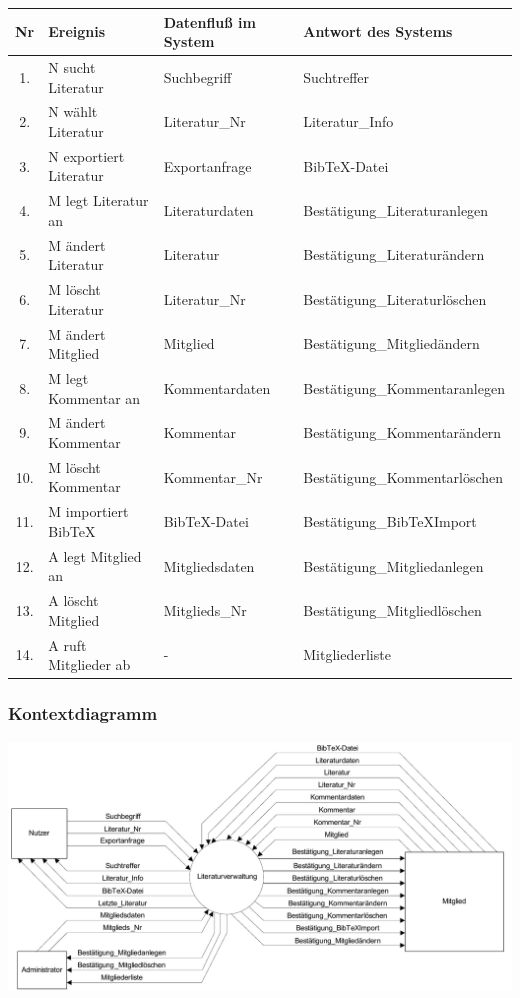 \begin{longtable}{|c|p{9.0em}|p{10.5em}|l|}
\hline
Nr & Ereignis & Datenfluß im System & Antwort des Systems \\
\hline\hline
\endhead

1. & N sucht Literatur & Suchbegriff & Suchtreffer \\\hline
2. & N wählt Literatur & Literatur\_Nr & Literatur\_Info \\\hline
3. & N exportiert Literatur & Exportanfrage &  BibTeX-Datei \\\hline
4. & M legt Literatur an & Literaturdaten & Bestätigung\_Literaturanlegen \\\hline
5. & M ändert Literatur & Literatur & Bestätigung\_Literaturändern\\\hline
6. & M löscht Literatur & Literatur\_Nr & Bestätigung\_Literaturlöschen \\\hline
7. & M ändert Mitglied & Mitglied & Bestätigung\_Mitgliedändern \\\hline
8. & M legt Kommentar an & Kommentardaten & Bestätigung\_Kommentaranlegen \\\hline
9. & M ändert Kommentar & Kommentar & Bestätigung\_Kommentarändern \\\hline
10. & M löscht Kommentar & Kommentar\_Nr & Bestätigung\_Kommentarlöschen \\\hline
11.& M importiert BibTeX & BibTeX-Datei & Bestätigung\_BibTeXImport \\\hline
12.& A legt Mitglied an & Mitgliedsdaten & Bestätigung\_Mitgliedanlegen \\\hline
13.& A löscht Mitglied & Mitglieds\_Nr & Bestätigung\_Mitgliedlöschen \\\hline
14.& A ruft Mitglieder ab & - & Mitgliederliste \\\hline
\end{longtable}

\newpage %
\subsubsection{Kontextdiagramm}

\includegraphics[scale=0.75]{kontextdiagramm}

